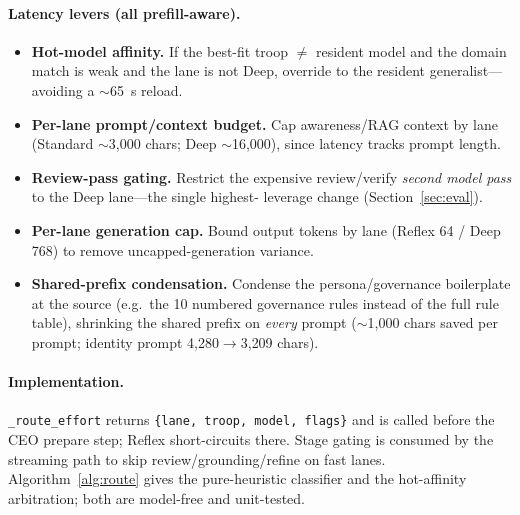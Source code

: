 \documentclass[10pt,twocolumn]{article}
\begin{document}
\paragraph{Latency levers (all prefill-aware).}
\begin{itemize}
  \item \textbf{Hot-model affinity.} If the best-fit troop $\neq$ resident
        model and the domain match is weak and the lane is not Deep,
        override to the resident generalist---avoiding a $\sim$65~s reload.
  \item \textbf{Per-lane prompt/context budget.} Cap awareness/RAG context
        by lane (Standard $\sim$3{,}000 chars; Deep $\sim$16{,}000), since
        latency tracks prompt length.
  \item \textbf{Review-pass gating.} Restrict the expensive review/verify
        \emph{second model pass} to the Deep lane---the single highest-
        leverage change (Section~\ref{sec:eval}).
  \item \textbf{Per-lane generation cap.} Bound output tokens by lane
        (Reflex 64 / Deep 768) to remove uncapped-generation variance.
  \item \textbf{Shared-prefix condensation.} Condense the persona/governance
        boilerplate at the source (e.g.\ the 10 numbered governance rules
        instead of the full rule table), shrinking the shared prefix on
        \emph{every} prompt ($\sim$1{,}000 chars saved per prompt; identity
        prompt 4{,}280$\to$3{,}209 chars).
\end{itemize}

\paragraph{Implementation.}
\texttt{\_route\_effort} returns \texttt{\{lane, troop, model, flags\}} and
is called before the CEO prepare step; Reflex short-circuits there. Stage
gating is consumed by the streaming path to skip review/grounding/refine on
fast lanes. Algorithm~\ref{alg:route} gives the pure-heuristic classifier and
the hot-affinity arbitration; both are model-free and unit-tested.
\end{document}
